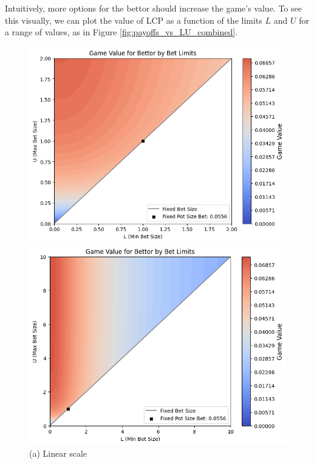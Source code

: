 \documentclass[../../main/main.tex]{subfiles}
\begin{document}
Intuitively, more options for the bettor should increase the game's value. To see this visually, we can plot the value of LCP as a function of the limits $L$ and $U$ for a range of values, as in Figure \ref{fig:payoffs_vs_LU_combined}.

\begin{figure}[h!]
    \begin{adjustwidth}{-1in}{-1in}
        \centering
        \begin{minipage}{0.6\textwidth}
            \centering
            \includegraphics[width=\textwidth]{images/payoffs_by_limits.png}
            \caption*{(a) Linear scale}
        \end{minipage}
        \hspace{0.05\textwidth}
        \begin{minipage}{0.6\textwidth}
            \centering
            \includegraphics[width=\textwidth]{images/payoffs_by_limits_wide.png}

\end{minipage}
\end{adjustwidth}
\end{figure}
\end{document}
